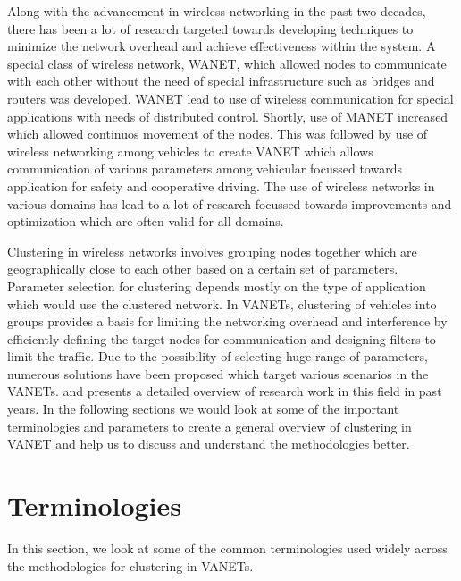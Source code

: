 \documentclass[]{ccs-thesis}
\begin{document}
Along with the advancement in wireless networking in the past two decades, there has been a lot of research targeted
towards developing techniques to minimize the network overhead and achieve effectiveness within the system. A special
class of wireless network, \ac{WANET},  which allowed nodes to communicate with each other without the need of
special infrastructure such as bridges and routers was developed. \ac{WANET} lead to use of wireless communication
for special applications with needs of distributed control. Shortly, use of \ac{MANET} increased which allowed
continuos movement of the nodes. This was followed by use of wireless networking among vehicles to create \ac{VANET}
which allows communication of various parameters among vehicular focussed towards application for safety and cooperative
driving. The use of wireless networks in various domains has lead to a lot of research focussed towards improvements
and optimization which are often valid for all domains.

Clustering in wireless networks involves grouping nodes together which are geographically close to each other based on a
certain set of parameters. Parameter selection for clustering depends mostly on the type of application which would use
the clustered network. In \ac{VANET}s, clustering of vehicles into groups provides a basis for limiting the networking
overhead and interference by efficiently defining the target nodes for communication and designing filters to limit the traffic.
Due to the possibility of selecting huge range of parameters, numerous solutions have been proposed which target various
scenarios in the \ac{VANET}s. \textcite{6256251} and \textcite{BALI2014134} presents a detailed overview of research work in this
field in past years. In the following sections we would look at some of the important terminologies and parameters to create
a general overview of clustering in \ac{VANET} and help us to discuss and understand the methodologies better.

\section{Terminologies}

In this section, we look at some of the common terminologies used widely across the methodologies
for clustering in \ac{VANET}s.
\end{document}
